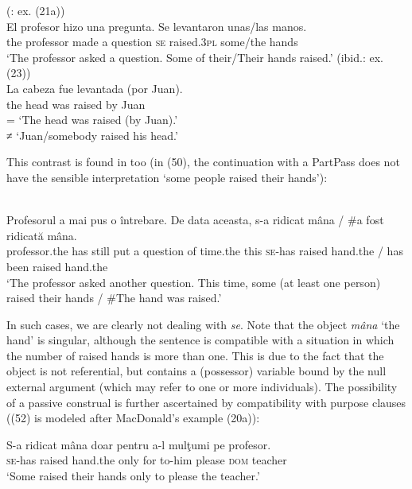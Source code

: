 \documentclass[output=paper]{langsci/langscibook}
\begin{document}
\ea%
    \label{ex:giurgea:49}
    \ea {} (\citealt{MacDonald2017}: ex. (21a))\\
    \gll El   profesor   hizo   una pregunta. Se  levantaron unas/las   manos. \\
         the professor  made a      question  \textsc{se}  raised.\textsc{3pl}  some/the hands         \\
    \glt ‘The professor asked a question. Some of their/Their hands raised.’
    \ex   {} (ibid.: ex. (23))\\
    \gll La cabeza fue levantada (por Juan).    \\
         the head   was raised        by  Juan\\
    \glt = ‘The head was raised (by Juan).’\\
         ≠ ‘Juan/somebody raised his head.’
\z
\z

This contrast is found in  too (in (50), the continuation with a PartPass does not have the sensible interpretation ‘some people raised their hands’):

\ea%
    \label{ex:giurgea:50}\\
    \gll Profesorul      a   mai pus o întrebare. De data aceasta, s-a       ridicat mâna / \#a fost ridicată mâna.\\
         professor.the has still put a question  of time.the this   \textsc{se}-has raised  hand.the / has been raised hand.the\\
    \glt ‘The professor asked another question. This time, some (at least one person) raised their hands / \#The hand	was raised.’\\
\z

In such cases, we are clearly not dealing with  \textit{se}. Note that the object \textit{mâna} ‘the hand’ is singular, although the sentence is compatible with a situation in which the number of raised hands is more than one. This is due to the fact that the object is not referential, but contains a (possessor) variable bound by the null external argument (which may refer to one or more individuals). The possibility of a passive construal is further ascertained by compatibility with purpose clauses ((52) is modeled after MacDonald’s example (20a)):

\ea%
    \label{ex:giurgea:51}
    \gll S-a      ridicat mâna     doar  pentru a-l      mulţumi  pe   profesor.\\
         \textsc{se}-has raised hand.the only for      to-him please    \textsc{dom} teacher\\
    \glt ‘Some raised their hands only to please the teacher.’
\z
\end{document}
